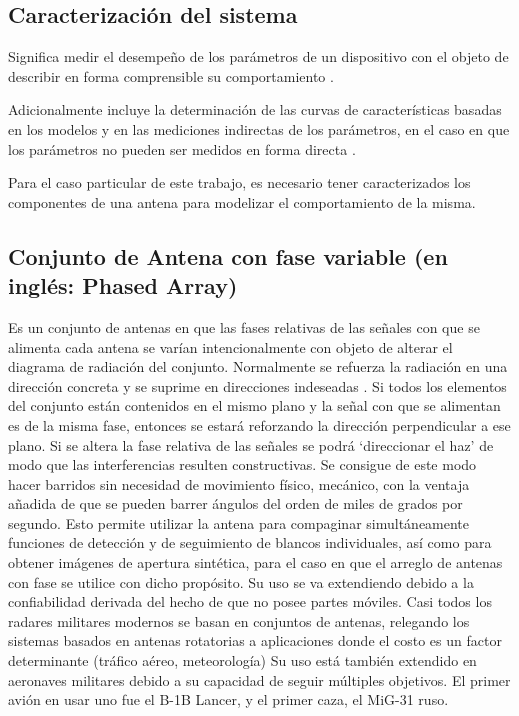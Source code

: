 \subsection{Caracterización del sistema}

Significa medir el desempeño de los parámetros de un dispositivo con el objeto de describir en
forma comprensible su comportamiento \cite{Mittermayer2007}.

Adicionalmente incluye la determinación de las curvas de características basadas
en los modelos y en las mediciones indirectas de los parámetros, en el caso en que los parámetros no pueden ser medidos
en forma directa \cite{Mittermayer2007}.

Para el caso particular de este trabajo, es necesario tener caracterizados los componentes de una antena para modelizar el 
comportamiento de la misma.


\subsection{Conjunto de Antena con fase variable (en inglés: Phased Array)}

Es un conjunto de antenas en que las fases relativas de las señales con que se alimenta cada antena se varían intencionalmente
con objeto de alterar el diagrama de radiación del conjunto. Normalmente se refuerza la radiación en una dirección concreta y
se suprime en direcciones indeseadas \cite{Standard1996}. Si todos los elementos del conjunto están contenidos en el mismo plano
y la señal con que se alimentan es de la misma fase, entonces se estará reforzando la dirección perpendicular a ese plano. Si
se altera la fase relativa de las señales se podrá \enquote*{direccionar el haz} de modo que las interferencias resulten
constructivas. Se consigue de este modo hacer barridos sin necesidad de movimiento físico, mecánico, con la ventaja añadida de
que se pueden barrer ángulos del orden de miles de grados por segundo. Esto permite utilizar la antena para compaginar
simultáneamente funciones de detección y de seguimiento de blancos individuales, así como para obtener imágenes de apertura
sintética, para el caso en que el arreglo de antenas con fase se utilice con dicho propósito. Su uso se va extendiendo debido a
la confiabilidad derivada del hecho de que no posee partes móviles. Casi todos los radares militares modernos se basan en
conjuntos de antenas, relegando los sistemas basados en antenas rotatorias a aplicaciones donde el costo es un factor
determinante (tráfico aéreo, meteorología) Su uso está también extendido en aeronaves militares debido a su capacidad de
seguir múltiples objetivos. El primer avión en usar uno fue el B-1B Lancer, y el primer caza, el MiG-31 ruso.


